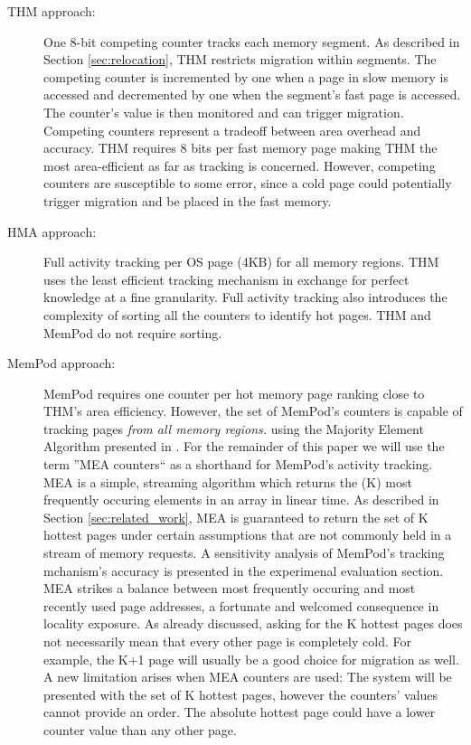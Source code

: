\begin{description}
	\item[THM approach:] One 8-bit competing counter tracks each memory segment. As described in Section \ref{sec:relocation}, THM restricts migration within segments. The competing counter is incremented by one when a page in slow memory is accessed and decremented by one when the segment's fast page is accessed. The counter's value is then monitored and can trigger migration. Competing counters represent a tradeoff between area overhead and accuracy. THM requires 8 bits per fast memory page making THM the most area-efficient as far as tracking is concerned. However, competing counters are susceptible to some error, since a cold page could potentially trigger migration and be placed in the fast memory.
	\item[HMA approach:] Full activity tracking per OS page (4KB) for all memory regions. THM uses the least efficient tracking mechanism in exchange for perfect knowledge at a fine granularity. Full activity tracking also introduces the complexity of sorting all the counters to identify hot pages. THM and MemPod do not require sorting.
	\item[MemPod approach:] MemPod requires one counter per hot memory page ranking close to THM's area efficiency. However, the set of MemPod's counters is capable of tracking pages \textit{from all memory regions.} using the Majority Element Algorithm presented in . For the remainder of this paper we will use the term ''MEA counters`` as a shorthand for MemPod's activity tracking. MEA is a simple, streaming algorithm which returns the (K) most frequently occuring elements in an array in linear time. As described in Section \ref{sec:related_work}, MEA is guaranteed to return the set of K hottest pages under certain assumptions that are not commonly held in a stream of memory requests. A sensitivity analysis of MemPod's tracking mchanism's accuracy is presented in the experimenal evaluation section. MEA strikes a balance between most frequently occuring and most recently used page addresses, a fortunate and welcomed consequence in locality exposure. As already discussed, asking for the K hottest pages does not necessarily mean that every other page is completely cold. For example, the K+1 page will usually be a good choice for migration as well. A new limitation arises when MEA counters are used: The system will be presented with the set of K hottest pages, however the counters' values cannot provide an order. The absolute hottest page could have a lower counter value than any other page.
\end{description}

